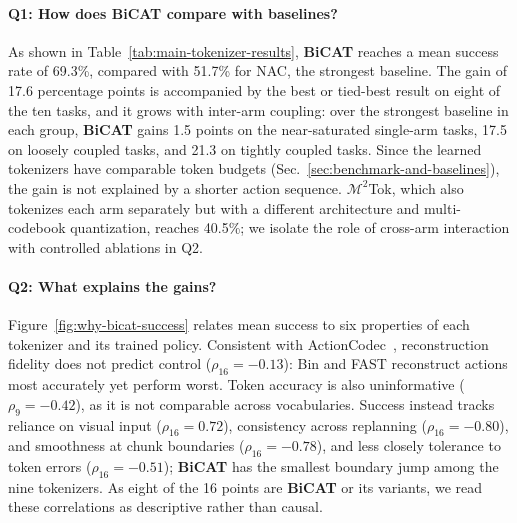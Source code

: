 \paragraph{Q1: How does BiCAT compare with baselines?}
As shown in Table~\ref{tab:main-tokenizer-results}, \textbf{BiCAT} reaches a mean
success rate of 69.3\%, compared with 51.7\% for NAC, the strongest
baseline. The gain of 17.6 percentage points
is accompanied by the best or tied-best result on eight of the ten tasks,
and it grows with inter-arm coupling: over the strongest baseline in each
group, \textbf{BiCAT} gains 1.5 points on the near-saturated single-arm
tasks, 17.5 on loosely coupled tasks, and 21.3 on tightly coupled tasks.
Since the learned tokenizers have comparable token budgets
(Sec.~\ref{sec:benchmark-and-baselines}), the gain is not explained by a shorter action sequence.
$\mathcal{M}^{2}$Tok, which also tokenizes each arm separately but with a
different architecture and multi-codebook quantization, reaches 40.5\%; we
isolate the role of cross-arm interaction with controlled ablations in Q2.




\paragraph{Q2: What explains the gains?}
Figure~\ref{fig:why-bicat-success} relates mean success to six properties of
each tokenizer and its trained policy. Consistent with
ActionCodec~\cite{dong2026actioncodec}, reconstruction fidelity does not
predict control ($\rho_{16}=-0.13$): Bin and FAST reconstruct actions most
accurately yet perform worst. Token accuracy is also uninformative
($\rho_{9}=-0.42$), as it is not comparable across vocabularies. Success
instead tracks reliance on visual input ($\rho_{16}=0.72$), consistency
across replanning ($\rho_{16}=-0.80$), and smoothness at chunk boundaries
($\rho_{16}=-0.78$), and less closely tolerance to token errors
($\rho_{16}=-0.51$); \textbf{BiCAT} has the smallest boundary jump among the
nine tokenizers. As eight of the 16 points are \textbf{BiCAT} or its
variants, we read these correlations as descriptive rather than causal.

